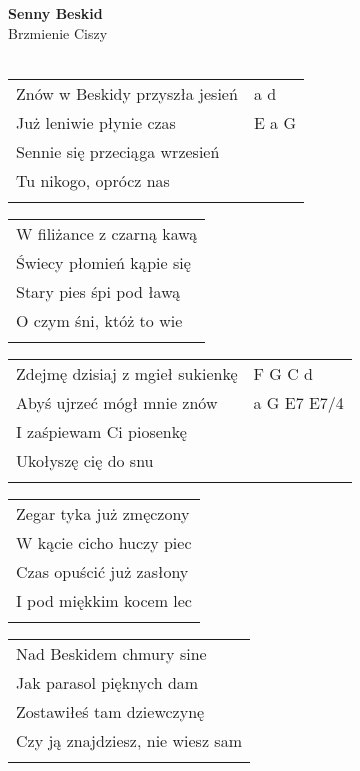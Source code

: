 \documentclass[a5paper]{article}
\begin{document}


\noindent
\fontsize{12pt}{15pt}\selectfont
\textbf{Senny Beskid} \\
\fontsize{8pt}{10pt}\selectfont
Brzmienie Ciszy \\ \\
\fontsize{10pt}{12pt}\selectfont
{}
\begin{tabular}{@{}p{6.50cm}p{3cm}@{}}
\noindent
Znów w Beskidy przyszła jesień & a d \\
Już leniwie płynie czas & E a G \\
Sennie się przeciąga wrzesień & \\
Tu nikogo, oprócz nas & \\ \\
\end{tabular}

\noindent
\begin{tabular}{@{}p{6.50cm}@{}}
W filiżance z czarną kawą \\
Świecy płomień kąpie się \\
Stary pies śpi pod ławą \\
O czym śni, któż to wie \\ \\
\end{tabular}

\noindent
\begin{tabular}{@{}p{5.50cm}p{3cm}@{}}
Zdejmę dzisiaj z mgieł sukienkę & F G C d \\
Abyś ujrzeć mógł mnie znów  & a G E7 E7/4 \\
I zaśpiewam Ci piosenkę & \\
Ukołyszę cię do snu & \\ \\
\end{tabular}

\noindent
\begin{tabular}{@{}p{6.50cm}@{}}
Zegar tyka już zmęczony \\
W kącie cicho huczy piec \\
Czas opuścić już zasłony \\
I pod miękkim kocem lec \\ \\
\end{tabular}

\noindent
\begin{tabular}{@{}p{6.50cm}@{}}
Nad Beskidem chmury sine \\
Jak parasol pięknych dam \\
Zostawiłeś tam dziewczynę \\
Czy ją znajdziesz, nie wiesz sam \\ \\
\end{tabular}
\end{document}
